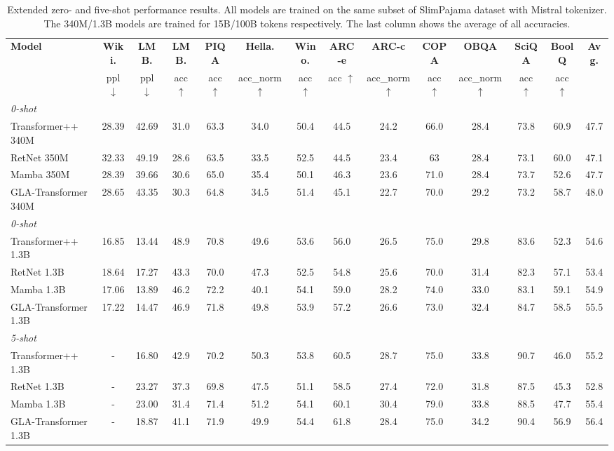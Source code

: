%
%
\begin{table}[ht]
\centering
\tiny
\begin{tabular}{l|ccccccccccccc}
\toprule
\textbf{Model}  & \textbf{Wiki.}  &  \textbf{LMB.} & \textbf{LMB.} & \textbf{PIQA} &    \textbf{Hella.} & \textbf{Wino.} & \textbf{ARC-e} &  \textbf{ARC-c} & \textbf{COPA} &  \textbf{OBQA} & \textbf{SciQA} &  \textbf{BoolQ} &   \textbf{Avg.}  \\
 & ppl $\downarrow$  & ppl $\downarrow$  & acc $\uparrow$  & acc $\uparrow$ &   acc\_norm $\uparrow$  & acc $\uparrow$  & acc $\uparrow$ & acc\_norm $\uparrow$  & acc $\uparrow$ & acc\_norm $\uparrow$ & acc $\uparrow$ & acc $\uparrow$ \\
\midrule
\small{\textit{0-shot}}  \\
Transformer++ 340M & 28.39 & 	42.69	& 31.0 & 	63.3 &	34.0 &	50.4 & 44.5	& 24.2 & 66.0 &	28.4	& 73.8	& 60.9 & 47.7 \\
RetNet 350M & 32.33 & 49.19	& 28.6 &	63.5 &	33.5 & 52.5 &	44.5	& 23.4 &	63 &	28.4 & 73.1	& 60.0 & 47.1 \\
Mamba 350M & 28.39 &  39.66 & 30.6 & 65.0 & 35.4 & 50.1 & 46.3 & 23.6 & 71.0 & 28.4 & 73.7 & 52.6 & 47.7 \\
GLA-Transformer 340M & 28.65 & 43.35 & 30.3 & 64.8 & 34.5 &	51.4 & 45.1	& 22.7 & 70.0 &29.2 & 73.2 & 58.7 & 48.0 \\
\midrule 
\small{\textit{0-shot}} \\
Transformer++ 1.3B & 16.85 & 13.44 &  48.9 & 70.8 & 49.6 & 53.6 & 56.0 & 26.5 & 
 75.0 & 29.8 & 83.6 & 52.3 & 54.6 \\
RetNet 1.3B & 18.64  & 17.27 & 43.3 & 70.0 & 47.3 & 52.5 & 54.8 & 25.6 & 70.0 & 31.4 & 82.3 & 57.1 & 53.4  \\
Mamba 1.3B &  17.06  & 13.89 & 46.2 & 72.2 &  40.1 & 54.1 &  59.0 &	28.2 & 74.0 & 33.0 & 83.1 & 59.1 & 54.9     \\
GLA-Transformer 1.3B & 17.22 & 14.47 & 46.9 & 71.8 & 49.8 & 53.9 & 57.2 & 26.6 & 73.0 & 32.4 & 84.7 & 58.5 & 55.5 \\
\midrule
\small{\textit{5-shot}} \\
Transformer++ 1.3B & - & 16.80 & 42.9 & 70.2 & 50.3 &	53.8 & 60.5	& 28.7 & 75.0 & 33.8 & 90.7 & 46.0 & 55.2 \\
RetNet 1.3B & - &  23.27 & 37.3 & 69.8 & 47.5 & 51.1 & 58.5 &	27.4 & 72.0 & 31.8 & 87.5 & 45.3 & 52.8 \\
Mamba 1.3B & - & 23.00 & 31.4 & 71.4 &  51.2	 & 54.1 & 60.1 & 30.4  & 79.0 & 33.8 & 88.5 & 47.7 & 55.4 \\
GLA-Transformer 1.3B & - & 18.87 & 41.1 & 71.9 & 49.9 & 54.4 & 61.8 & 28.4 & 75.0 & 34.2 & 90.4 & 56.9 & 56.4 \\
\bottomrule
\end{tabular}
\centering
\caption{Extended zero- and five-shot performance results. All models are trained on the same subset of SlimPajama dataset with Mistral tokenizer. The 340M/1.3B models are trained for 15B/100B tokens respectively. The last column shows the average of all accuracies.}
\label{tab:extended_results}
\end{table}
%
%
